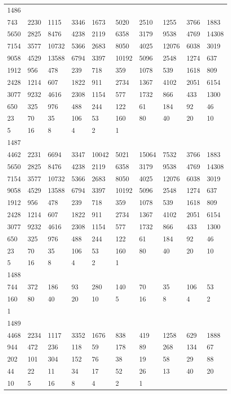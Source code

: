 \begin{longtable}{*{10}{l}}
1486&&&&&&&&&\\
743& 2230& 1115& 3346& 1673& 5020& 2510& 1255& 3766& 1883\\
5650& 2825& 8476& 4238& 2119& 6358& 3179& 9538& 4769& 14308\\
7154& 3577& 10732& 5366& 2683& 8050& 4025& 12076& 6038& 3019\\
9058& 4529& 13588& 6794& 3397& 10192& 5096& 2548& 1274& 637\\
1912& 956& 478& 239& 718& 359& 1078& 539& 1618& 809\\
2428& 1214& 607& 1822& 911& 2734& 1367& 4102& 2051& 6154\\
3077& 9232& 4616& 2308& 1154& 577& 1732& 866& 433& 1300\\
650& 325& 976& 488& 244& 122& 61& 184& 92& 46\\
23& 70& 35& 106& 53& 160& 80& 40& 20& 10\\
5& 16& 8& 4& 2& 1& \\

1487&&&&&&&&&\\
4462& 2231& 6694& 3347& 10042& 5021& 15064& 7532& 3766& 1883\\
5650& 2825& 8476& 4238& 2119& 6358& 3179& 9538& 4769& 14308\\
7154& 3577& 10732& 5366& 2683& 8050& 4025& 12076& 6038& 3019\\
9058& 4529& 13588& 6794& 3397& 10192& 5096& 2548& 1274& 637\\
1912& 956& 478& 239& 718& 359& 1078& 539& 1618& 809\\
2428& 1214& 607& 1822& 911& 2734& 1367& 4102& 2051& 6154\\
3077& 9232& 4616& 2308& 1154& 577& 1732& 866& 433& 1300\\
650& 325& 976& 488& 244& 122& 61& 184& 92& 46\\
23& 70& 35& 106& 53& 160& 80& 40& 20& 10\\
5& 16& 8& 4& 2& 1& \\

1488&&&&&&&&&\\
744& 372& 186& 93& 280& 140& 70& 35& 106& 53\\
160& 80& 40& 20& 10& 5& 16& 8& 4& 2\\
1& \\

1489&&&&&&&&&\\
4468& 2234& 1117& 3352& 1676& 838& 419& 1258& 629& 1888\\
944& 472& 236& 118& 59& 178& 89& 268& 134& 67\\
202& 101& 304& 152& 76& 38& 19& 58& 29& 88\\
44& 22& 11& 34& 17& 52& 26& 13& 40& 20\\
10& 5& 16& 8& 4& 2& 1& \\


\end{longtable}
